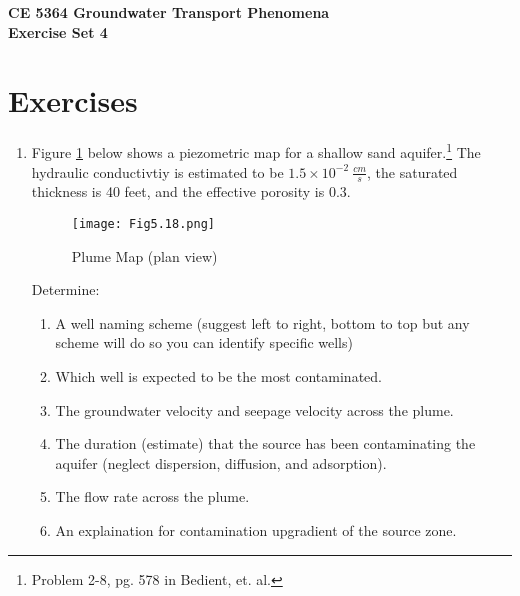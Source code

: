 \documentclass[12pt]{article}
\begin{document}
\begin{center}
{\textbf{{ CE 5364 Groundwater Transport Phenomena } \\ {Exercise Set 4}}}
\end{center}

\section*{\small{Exercises}}
\begin{enumerate}%
\item Figure \ref{fig:plumemap} below shows a piezometric map for a shallow sand aquifer.\footnote{Problem 2-8, pg. 578 in Bedient, et. al.}  The hydraulic conductivtiy is estimated to be $1.5 \times 10^{-2}~\frac{cm}{s}$, the saturated thickness is 40 feet, and the effective porosity is 0.3.

\begin{figure}[h!] %
   \centering
   \texttt{[image: Fig5.18.png]} 
   \caption{Plume Map (plan view)}
   \label{fig:plumemap}
\end{figure}

\clearpage
Determine:
\begin{enumerate}
\item A well naming scheme (suggest left to right, bottom to top but any scheme will do so you can identify specific wells)
\item Which well is expected to be the most contaminated.
\item The groundwater velocity and seepage velocity across the plume.
\item The duration (estimate) that the source has been contaminating the aquifer (neglect dispersion, diffusion, and adsorption).
\item The flow rate across the plume.
\item An explaination for contamination upgradient of the source zone.
\end{enumerate}

\end{enumerate}%
\end{document}
